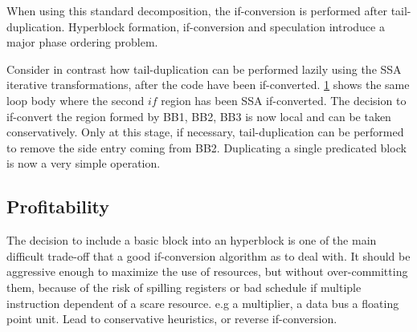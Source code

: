 \begin{figure}[h]
{    \label{fig:hyper4}}
\end{figure}

When using this standard decomposition, the if-conversion is performed after tail-duplication. Hyperblock formation, if-conversion and speculation introduce a major phase ordering problem. 

Consider in contrast how tail-duplication can be performed lazily using the SSA iterative transformations, after the code have been if-converted. \ref{fig:hyper4} shows the same loop body where the second $if$ region has been SSA if-converted. The decision to if-convert the region formed by {BB1, BB2, BB3} is now local and can be taken conservatively. Only at this stage, if necessary, tail-duplication can be performed to remove the side entry coming from BB2. Duplicating a single predicated block is now a very simple operation.

\subsection{Profitability}

The decision to include a basic block into an hyperblock is one of the main difficult trade-off that a good if-conversion algorithm as to deal with. It should be aggressive enough to maximize the use of resources, but without over-committing them, because of the risk of spilling registers or bad schedule if multiple instruction dependent of a scare resource. e.g a multiplier, a data bus a floating point unit. Lead to conservative heuristics, or reverse if-conversion.

